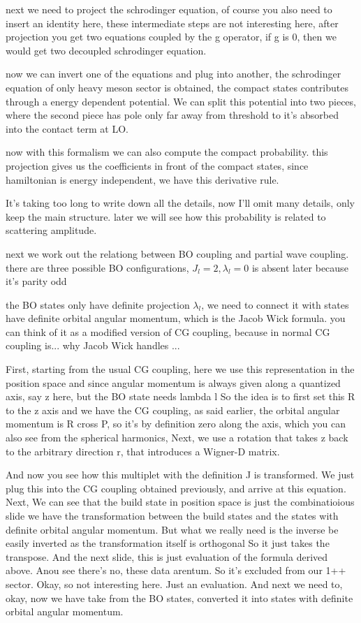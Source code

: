 \documentclass[11pt]{article}
\begin{document}
next we need to project the schrodinger equation,  of course you also need to insert an identity here, these intermediate steps are not interesting here, after projection you get two equations coupled by the g operator, if g is 0, then we would get two decoupled schrodinger equation.

now we can invert one of the equations and plug into another, the schrodinger equation of only heavy meson sector is obtained, the compact states contributes through a energy dependent potential. We can split this potential into two pieces, where the second piece has pole only far away from threshold to it's absorbed into the contact term at LO.

now with this formalism we can also compute the compact probability. this projection gives us the coefficients in front of the compact states, since hamiltonian is energy independent, we have this derivative rule.

It's taking too long to write down all the details, now I'll omit many details, only keep the main structure.
later we will see how this probability is related to scattering amplitude.

next we work out the relationg between BO coupling and partial wave coupling.
there are three possible BO configurations, $J_l = 2, \lambda_l = 0$ is absent later because it's parity odd

the BO states only have definite projection $\lambda_l$, we need to connect it with states have definite orbital angular momentum, which is the Jacob Wick formula. you can think of it as a modified version of CG coupling, because in normal CG coupling is... why Jacob Wick handles ...

First, starting from the usual CG coupling, here we use this representation in the position space and since angular momentum is always given along a quantized axis, say z here, but the BO state needs lambda l So the idea is to first set this R to the z axis and we have the CG coupling, as said earlier, the orbital angular momentum is R cross P, so it's by definition zero along the axis, which you can also see from the spherical harmonics, Next, we use a rotation that takes z back to the arbitrary direction r, that introduces a Wigner-D matrix.

And now you see how this multiplet with the definition J is transformed. We just plug this into the CG coupling obtained previously, and arrive at this equation. Next, We can see that the build state in position space is just the combinatioious slide we have the transformation between the build states and the states with definite orbital angular momentum. But what we really need is the inverse  be easily inverted as the transformation itself is orthogonal So it just takes the transpose. And the next slide, this is just evaluation of the formula derived above. Anou see there's no, these data arentum. So it's excluded from our 1++ sector. Okay, so not interesting here. Just an evaluation. And next we need to, okay, now we have take from the BO states, converted it into states with definite orbital angular momentum.
\end{document}
